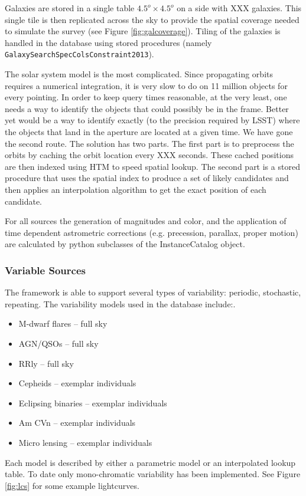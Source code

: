 \documentclass[]{article}
\begin{document}
{Galaxies are stored in a single table $4.5^o \times 4.5^o$ on a side with XXX galaxies. This single tile is then replicated across the sky to 
provide the spatial coverage needed to simulate the survey (see Figure \ref{fig:galcoverage}).  
Tiling of the galaxies is handled in the database using stored procedures (namely {\tt GalaxySearchSpecColsConstraint2013}).

The solar system model is the most complicated.  Since propagating orbits requires a numerical integration, it is very slow to do on 
11 million objects for every pointing.  In order to keep query times reasonable, at the very least, one needs a way to 
identify the objects that could possibly be in the frame.  Better yet would be a way to identify exactly (to the precision
required by LSST) where the objects that land in the aperture are located at a given time.  We have gone the second route.
The solution has two parts.  The first part is to preprocess the orbits by caching the orbit location every XXX seconds. 
These cached positions are then indexed using HTM to speed spatial lookup.
The second part is a stored procedure that uses the spatial index to produce a set of likely candidates and then applies
an interpolation algorithm to get the exact position of each candidate.

For all sources the generation of magnitudes and color, and the application of time dependent astrometric corrections (e.g. 
precession, parallax, proper motion) are calculated by python subclasses of the InstanceCatalog object.

\subsubsection{Variable Sources}
The framework is able to support several types of variability: periodic, stochastic, repeating.
The variability models used in the database include:.  
\begin{itemize}
\item M-dwarf flares -- full sky
\item AGN/QSOs -- full sky
\item RRly -- full sky
\item Cepheids -- exemplar individuals
\item Eclipsing binaries -- exemplar individuals
\item Am CVn -- exemplar individuals
\item Micro lensing -- exemplar individuals
\end{itemize}
Each model is described by either a parametric model or an interpolated lookup table.  To date only mono-chromatic variability has been implemented.
See Figure \ref{fig:lcs} for some example lightcurves.

}
\end{document}
